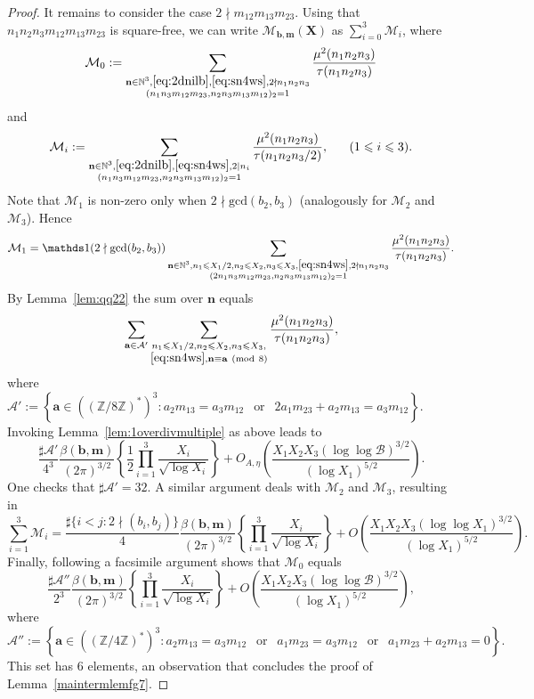 \documentclass[a4paper,12pt,reqno]{amsart}
\numberwithin{equation}{section} \numberwithin{figure}{section}
\newcommand\Z{\mathbb{Z}}
\newcommand\N{\mathbb{N}}
\renewcommand{\mod}[1]{ \ \left(\textnormal{mod}\ #1\right)}
\renewcommand{\l}{\left}
\renewcommand{\r}{\right}
\renewcommand{\b}{\mathbf}
\renewcommand{\c}{\mathcal}
\renewcommand{\gcd}{\textrm{gcd}}
\renewcommand{\leq}{\leqslant}
\renewcommand{\#}{\sharp}
\theoremstyle{definition}
\numberwithin{lemma}{section}
\begin{document}
\begin{proof}
It remains to consider the case  $2\nmid m_{12}m_{13}m_{23}$. Using    that 
$n_1n_2n_3 m_{12}m_{13}m_{23}$ is square-free, we can write  $\c M_{\b b , \b m }(\b X) $
as $\sum_{i=0}^3 \c M_i$, where
\[\c M_0:=\sum_{\substack{\b n \in \N^3, \eqref{eq:2dnilb}, \eqref{eq:sn4ws}, 2\nmid n_1n_2n_3   \\
(n_1   n_3   m_{12}  m_{23}  ,n_2    n_3  m_{13} m_{12} )_2 =1 }} 
 \frac{\mu^2(n_1n_2n_3)}{\tau(n_1n_2n_3) } 
\] and \[
\c M_i
:=\sum_{\substack{\b n \in \N^3, \eqref{eq:2dnilb}, \eqref{eq:sn4ws}, 2\mid n_i   \\
(n_1   n_3   m_{12}  m_{23}  ,n_2    n_3  m_{13} m_{12} )_2 =1 }} 
 \frac{\mu^2(n_1n_2n_3)}{\tau(n_1n_2n_3/2) } 
, \ \ \ \ \ (1\leq i \leq 3 ) .\] 
Note that $\c M_1$ is non-zero only when $2\nmid \gcd(b_2,b_3)$ (analogously for $\c M_2$ and $\c M_3$).
Hence  $$\c M_1=\mathds 1(2\nmid \gcd(b_2,b_3) )
\sum_{\substack{\b n  \in \N^3, n_1 \leq X_1/2,n_2\leq X_2, n_3\leq X_3, 
\eqref{eq:sn4ws}, 2\nmid n_1n_2n_3  \\
(2n_1   n_3   m_{12}  m_{23}  ,n_2    n_3  m_{13} m_{12} )_2 =1 }} 
 \frac{\mu^2(n_1n_2n_3)}{\tau(n_1n_2n_3) } .$$ By Lemma~\ref{lem:qq22} the sum over $ \b n $ equals 
  \[ \sum_{\b a \in \c A' }
\sum_{\substack{  n_1 \leq X_1/2,n_2\leq X_2, n_3\leq X_3, \\
\eqref{eq:sn4ws},  
\b n \equiv \b a \mod 8 }} 
 \frac{\mu^2(n_1n_2n_3)}{\tau(n_1n_2n_3) }
,\] where $\c A':= \l\{ \b a \in  ((\Z/8\Z)^*)^3 :  a_2    m_{13} =      a_3   m_{12}   \ \  \text{ or }  \  \ 
2a_1    m_{23} +a_2    m_{13}     =     a_3   m_{12}\r\} .$
Invoking  Lemma~\ref{lem:1overdivmultiple} as above leads to  
\[
\frac{\#\c A'}{4^3}
\frac{\beta(\b b , \b m )  }{(2\pi )^{3/2} }
\l\{\frac{1}{2} 
\prod_{i=1}^3 \frac{X_i }{ \sqrt{  \log X_i}   }  \r\}  
 + O_{A,\eta}
  \l ( \frac{X_1 X_2 X_3 (\log \log \c B )^{3/2}}{ (\log  X_1)^{5/2} }\r ) .\]
One checks that $\#\c A'=32$. A similar argument deals with $\c M_2$ and $\c M_3$, resulting in
$$\sum_{i=1}^3\c M_i=
\frac{\#\{  i< j : 2\nmid (b_i,b_j)\}  }{4 }
\frac{\beta(\b b , \b m )  }{(2\pi )^{3/2} }
\l\{ 
\prod_{i=1}^3 \frac{X_i }{ \sqrt{  \log X_i}   }  \r\}  
 + O 
  \l ( \frac{X_1 X_2 X_3 (\log \log X_1 )^{3/2}}{ (\log  X_1)^{5/2} }\r ) 
.$$ Finally, following a facsimile argument   shows that  
$\c M_0$ equals
\[ 
\frac{\#\c A''}{2^3}
\frac{\beta(\b b , \b m ) }{(2\pi )^{3/2} }
\l\{ 
\prod_{i=1}^3 \frac{X_i }{ \sqrt{  \log X_i}   }  \r\}  
 + O   \l ( \frac{X_1 X_2 X_3 (\log \log \c B )^{3/2}}{ (\log  X_1)^{5/2} }\r ) ,\]
where 
$$\c A'':= \l\{ \b a \in  ((\Z/4\Z)^*)^3 :  
a_2    m_{13} =      a_3   m_{12}   \ \  \text{ or }  \  \ 
a_1    m_{23} =      a_3   m_{12}   \ \  \text{ or }  \  \ 
a_1    m_{23} +a_2    m_{13}   =0
\r\} .$$ This set has $6$ elements, an observation that concludes the proof of  Lemma~\ref{maintermlemfg7}.
\end{proof}
 
\end{document}
